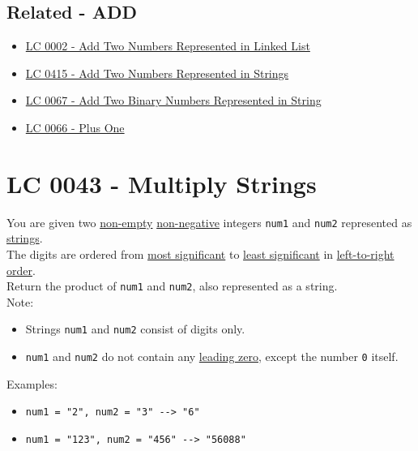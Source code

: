 \subsection*{Related - ADD}
\begin{itemize}
\item \hyperref[lc0002]{LC 0002 - Add Two Numbers Represented in Linked List}
\item \hyperref[lc0415]{LC 0415 - Add Two Numbers Represented in Strings}
\item \hyperref[lc0067]{LC 0067 - Add Two Binary Numbers Represented in String}
\item \hyperref[lc0066]{LC 0066 - Plus One}
\end{itemize}

\section{LC 0043 - Multiply Strings}\label{lc0043}
You are given two \ul{non-empty} \ul{non-negative} integers {\colorbox{CodeBackground}{\lstinline|num1|}} and {\colorbox{CodeBackground}{\lstinline|num2|}} represented as \ul{strings}. \\

The digits are ordered from \ul{most significant} to \ul{least significant} in \ul{left-to-right order}. \\

Return the product of {\colorbox{CodeBackground}{\lstinline|num1|}} and {\colorbox{CodeBackground}{\lstinline|num2|}}, also represented as a string.\\

Note: 
\begin{itemize}
\item Strings {\colorbox{CodeBackground}{\lstinline|num1|}} and {\colorbox{CodeBackground}{\lstinline|num2|}} consist of digits only.
\item {\colorbox{CodeBackground}{\lstinline|num1|}} and {\colorbox{CodeBackground}{\lstinline|num2|}} do not contain any \ul{leading zero}, except the number {\colorbox{CodeBackground}{\lstinline|0|}} itself.
\end{itemize}\mbox{}

Examples:
\begin{itemize}
\item {\colorbox{CodeBackground}{\lstinline|num1 = "2", num2 = "3" --> "6"|}}
\item {\colorbox{CodeBackground}{\lstinline|num1 = "123", num2 = "456" --> "56088"|}}
\end{itemize}

